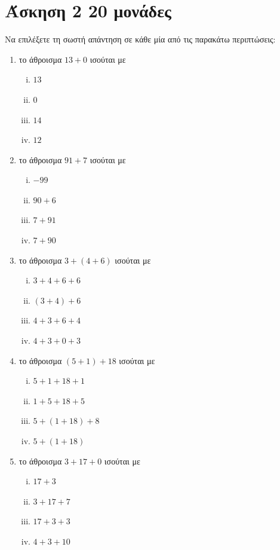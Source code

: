 \documentclass[a4paper,10pt]{report}
\begin{document}
\section*{Άσκηση 2  \hfill \small{20 μονάδες}}
Να επιλέξετε τη σωστή απάντηση σε κάθε μία από τις παρακάτω περιπτώσεις:
\begin{enumerate}[1)]
 \item το άθροισμα $13+0$ ισούται με %
\begin{multicols}{4}
\begin{enumerate}[i)]
 \item $13$
 \item $0$
 \item $14$
 \item $12$
\end{enumerate}
\end{multicols}
 \item το  άθροισμα $91+7$ ισούται με %
\begin{multicols}{4}
 \begin{enumerate}[i)]
 \item $-99$
 \item $90+6$
 \item $7+91$
 \item $7+90$
 \end{enumerate}
\end{multicols}
  \item το άθροισμα $3+(4+6)$ ισούται με %
\begin{multicols}{4}
\begin{enumerate}[i)]
 \item $3+4+6+6$
 \item $(3+4)+6$
 \item $4+3+6+4$
 \item $4+3+0+3$
\end{enumerate}
\end{multicols}
 \item το άθροισμα $(5+1)+18$ ισούται με %
\begin{multicols}{4}
\begin{enumerate}[i)]
 \item $5+1+18+1$
 \item $1+5+18+5$
 \item $5+(1+18)+8$
 \item $5+(1+18)$
\end{enumerate}
\end{multicols}
 \item το άθροισμα $3+17+0$ ισούται με %
\begin{multicols}{4}
\begin{enumerate}[i)]
 \item $17+3$
 \item $3+17+7$
 \item $17+3+3$
 \item $4+3+10$
\end{enumerate}
\end{multicols}
\end{enumerate}
\end{document}
